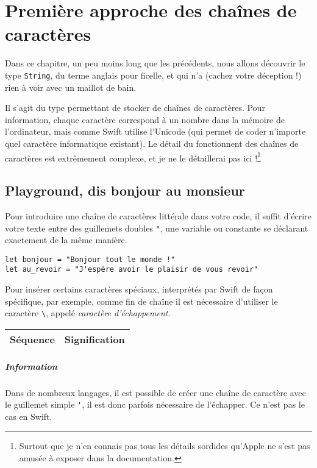 \chapter{Première approche des chaînes de caractères}
Dans ce chapitre, un peu moins long que les précédents, nous allons découvrir le type \texttt{String}, du terme anglais pour ficelle, et qui n'a (cachez votre déception !) rien à voir avec un maillot de bain.

Il s’agit du type permettant de stocker de chaînes de caractères. Pour information, chaque caractère correspond à un nombre dans la mémoire de l’ordinateur, mais comme Swift utilise l’Unicode (qui permet de coder n’importe quel caractère informatique existant). Le détail du fonctionnent des chaînes de caractères est extrêmement complexe, et je ne le détaillerai pas ici !\footnote{Surtout que je n'en connais pas tous les détails sordides qu'Apple ne s'est pas amusée à exposer dans la documentation.}
\section{Playground, dis bonjour au monsieur}
Pour introduire une chaîne de caractères littérale dans votre code, il suffit d'écrire votre texte entre des guillemets doubles \verb'"', une variable ou constante se déclarant exactement de la même manière.
\begin{listing}[h]
\begin{verbatim}
let bonjour = "Bonjour tout le monde !"
let au_revoir = "J'espère avoir le plaisir de vous revoir"
\end{verbatim}
\end{listing}

Pour insérer certains caractères spéciaux, interprétés par Swift de façon spécifique, par exemple, comme fin de chaîne il est nécessaire d'utiliser le caractère \verb"\", appelé \emph{caractère d'échappement}.
\begin{longtabu} to \linewidth {|X[1,l,m]|X[4,l,m]|}
\hline
Séquence & Signification \\ \hline
\endhead

\end{longtabu}

\paragraph{Information}
Dans de nombreux langages, il est possible de créer une chaîne de caractère avec le guillemet simple \verb"'", il est donc parfois nécessaire de l’échapper. Ce n’est pas le cas en Swift.

